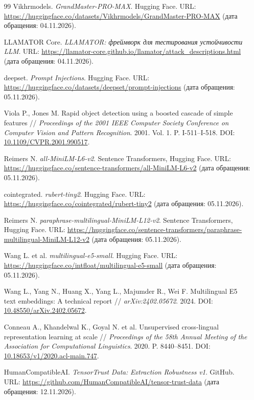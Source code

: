 \documentclass{misisarticle}
\begin{document}
\begin{thebibliography}{99}
 Vikhrmodels. \textit{GrandMaster-PRO-MAX}. Hugging Face. URL: \url{https://huggingface.co/datasets/Vikhrmodels/GrandMaster-PRO-MAX} (дата обращения: 04.11.2026).

 LLAMATOR Core. \textit{LLAMATOR: фреймворк для тестирования устойчивости LLM}. URL: \url{https://llamator-core.github.io/llamator/attack_descriptions.html} (дата обращения: 04.11.2026).

 deepset. \textit{Prompt Injections}. Hugging Face. URL: \url{https://huggingface.co/datasets/deepset/prompt-injections} (дата обращения: 05.11.2026).

 Viola P., Jones M. Rapid object detection using a boosted cascade of simple features // \textit{Proceedings of the 2001 IEEE Computer Society Conference on Computer Vision and Pattern Recognition}. 2001. Vol. 1. P. I-511--I-518. DOI: \href{https://doi.org/10.1109/CVPR.2001.990517}{10.1109/CVPR.2001.990517}.

 Reimers N. \textit{all-MiniLM-L6-v2}. Sentence Transformers, Hugging Face. URL: \url{https://huggingface.co/sentence-transformers/all-MiniLM-L6-v2} (дата обращения: 05.11.2026).

 cointegrated. \textit{rubert-tiny2}. Hugging Face. URL: \url{https://huggingface.co/cointegrated/rubert-tiny2} (дата обращения: 05.11.2026).

 Reimers N. \textit{paraphrase-multilingual-MiniLM-L12-v2}. Sentence Transformers, Hugging Face. URL: \url{https://huggingface.co/sentence-transformers/paraphrase-multilingual-MiniLM-L12-v2} (дата обращения: 05.11.2026).

 Wang L. et al. \textit{multilingual-e5-small}. Hugging Face. URL: \url{https://huggingface.co/intfloat/multilingual-e5-small} (дата обращения: 05.11.2026).

 Wang L., Yang N., Huang X., Yang L., Majumder R., Wei F. Multilingual E5 text embeddings: A technical report // \textit{arXiv:2402.05672}. 2024. DOI: \href{https://doi.org/10.48550/arXiv.2402.05672}{10.48550/arXiv.2402.05672}.

 Conneau A., Khandelwal K., Goyal N. et al. Unsupervised cross-lingual representation learning at scale // \textit{Proceedings of the 58th Annual Meeting of the Association for Computational Linguistics}. 2020. P. 8440--8451. DOI: \href{https://doi.org/10.18653/v1/2020.acl-main.747}{10.18653/v1/2020.acl-main.747}.

 HumanCompatibleAI. \textit{TensorTrust Data: Extraction Robustness v1}. GitHub. URL: \url{https://github.com/HumanCompatibleAI/tensor-trust-data} (дата обращения: 12.11.2026).

\end{thebibliography}
\end{document}
